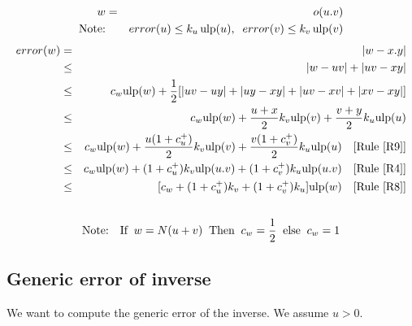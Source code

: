 \documentclass[12pt]{amsart}
\def\ulp{{\rm ulp}}
\newcommand{\U}[1]{\quad \mbox{[Rule~\ref{#1}]}}
\begin{document}
\begin{eqnarray}\nonumber
w&=&o(u.v) \\\nonumber
\textnormal{Note:}&& error(u) \leq k_u \, \ulp(u), \;\; error(v) \leq k_v \, \ulp(v)
\end{eqnarray}
\begin{eqnarray}\nonumber
error(w)& = &|w - x.y| \\\nonumber
& \leq &|w - u v| +|u v - x y| \\\nonumber
& \leq & c_w \ulp(w) +  \frac{1}{2} [|u v-u y|+|u y-x y|+|u v-x v|+|x v-x y|]\\\nonumber
& \leq & c_w \ulp(w) +  \frac{u+x}{2} k_v \ulp(v) + \frac{v+y}{2} k_u \ulp(u)\\\nonumber
& \leq & c_w \ulp(w) +  \frac{u(1+c_u^+)}{2} k_v \ulp(v) + \frac{v(1+c_v^+)}{2} k_u \ulp(u) \U{R9}\\\nonumber
& \leq & c_w \ulp(w) +  (1+c_u^+) k_v \ulp(u.v) + (1+c_v^+) k_u \ulp(u.v) \U{R4}\\\nonumber
& \leq & [ c_w +  (1+c_u^+) k_v + (1+c_v^+) k_u ] \ulp(w)\U{R8}\\\nonumber
\end{eqnarray}
\begin{eqnarray}\nonumber
\textnormal{Note:}&&\textnormal{If}\;\; w=N(u+v) \;\;\textnormal{Then}\;\; c_w =\frac{1}{2} \;\;\textnormal{else}\;\; c_w =1
\end{eqnarray}

\subsection{Generic error of inverse}\label{generic:inv}

We want to compute the generic error of the inverse.
We assume $u > 0$.
\end{document}
